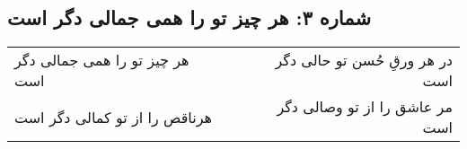 \begin{center}
\section*{شماره ۳: هر چیز تو را همی جمالی دگر است}
\label{sec:003}
\begin{longtable}{l p{0.5cm} r}
هر چیز تو را همی جمالی دگر است
&&
در هر ورقِ حُسن تو حالی دگر است
\\
هرناقص را از تو کمالی دگر است
&&
مر عاشق را از تو وصالی دگر است
\\
\end{longtable}
\end{center}
